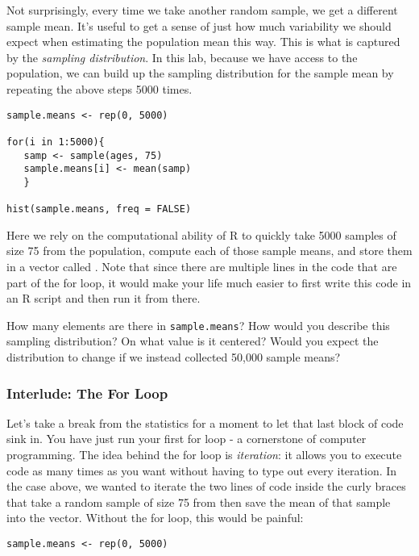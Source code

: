 \documentclass[11pt]{article}
\begin{document}
Not surprisingly, every time we take another random sample, we get a different sample mean.  It's useful to get a sense of just how much variability we should expect when estimating the population mean this way.  This is what is captured by the \emph{sampling distribution}.  In this lab, because we have access to the population, we can build up the sampling distribution for the sample mean by repeating the above steps 5000 times.

\begin{lstlisting}
sample.means <- rep(0, 5000)

for(i in 1:5000){
   samp <- sample(ages, 75)
   sample.means[i] <- mean(samp)
   }

hist(sample.means, freq = FALSE)
\end{lstlisting}

Here we rely on the computational ability of R to quickly take 5000 samples of size 75 from the population, compute each of those sample means, and store them in a vector called . Note that since there are multiple lines in the code that are part of the for loop, it would make your life much easier to first write this code in an R script and then run it from there.

\begin{exercise}
How many elements are there in \texttt{sample.means}?  How would you describe this sampling distribution?  On what value is it centered?  Would you expect the distribution to change if we instead collected 50,000 sample means?
\end{exercise}

\subsubsection*{Interlude: The For Loop}

Let's take a break from the statistics for a moment to let that last block of code sink in.  You have just run your first for loop - a cornerstone of computer programming.  The idea behind the for loop is \emph{iteration}: it allows you to execute code as many times as you want without having to type out every iteration.  In the case above, we wanted to iterate the two lines of code inside the curly braces that take a random sample of size 75 from  then save the mean of that sample into the  vector.  Without the for loop, this would be painful:

\begin{lstlisting}
sample.means <- rep(0, 5000)
\end{lstlisting}
\end{document}
